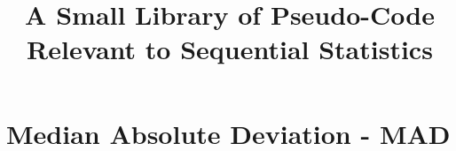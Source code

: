 \documentclass{article}
\title{A Small Library of Pseudo-Code Relevant to Sequential Statistics}
\begin{document}
\maketitle

\section{Median Absolute Deviation - MAD}

\end{document}
